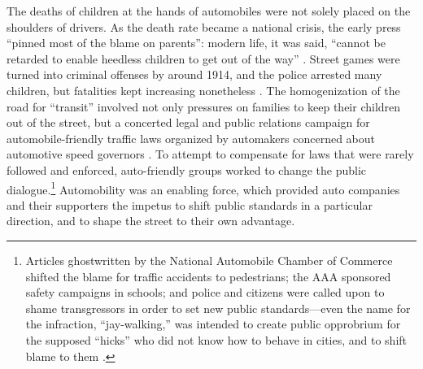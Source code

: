 
The deaths of children at the hands of
automobiles were not solely placed on the shoulders of drivers. As the
death rate became a national crisis, the
early press ``pinned most of the blame on parents'': modern life, it
was said, ``cannot be retarded to enable heedless children to get out
of the way'' \cite[p. 37]{zelizer}. Street games were turned into
criminal offenses by around 1914, and the police arrested many
children, but fatalities kept increasing nonetheless \cite[p.
  38]{zelizer}. The homogenization of the road
for ``transit'' \cite[p. 73]{lochlannjain} involved not only
pressures on families to keep their children out of the street, but a
concerted legal and public relations campaign for automobile-friendly
traffic laws organized by automakers concerned about automotive speed
governors \cite{voxNorton}. To attempt to
compensate for laws that were rarely followed and enforced,
auto-friendly groups worked to change the public dialogue.\footnote{Articles
ghostwritten by the National Automobile Chamber of Commerce shifted
the blame for traffic accidents to pedestrians; the AAA sponsored
safety campaigns in schools; and police and citizens were called upon
to shame transgressors in order to set new public standards---even the
name for the infraction, ``jay-walking,'' was intended to create
public opprobrium for the supposed ``hicks'' who did not know how to
behave in cities, and to shift blame to them \cite{voxNorton}.}
Automobility was an enabling 
force, which provided auto companies and their supporters the impetus
to shift public standards in a particular direction, and to shape the
street to their own advantage.

